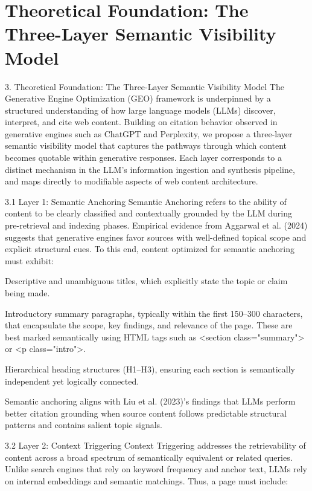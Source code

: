 \section{Theoretical Foundation: The Three-Layer Semantic Visibility Model}

3. Theoretical Foundation: The Three-Layer Semantic Visibility Model
The Generative Engine Optimization (GEO) framework is underpinned by a structured understanding of how large language models (LLMs) discover, interpret, and cite web content. Building on citation behavior observed in generative engines such as ChatGPT and Perplexity, we propose a three-layer semantic visibility model that captures the pathways through which content becomes quotable within generative responses. Each layer corresponds to a distinct mechanism in the LLM's information ingestion and synthesis pipeline, and maps directly to modifiable aspects of web content architecture.

3.1 Layer 1: Semantic Anchoring
Semantic Anchoring refers to the ability of content to be clearly classified and contextually grounded by the LLM during pre-retrieval and indexing phases. Empirical evidence from Aggarwal et al. (2024) suggests that generative engines favor sources with well-defined topical scope and explicit structural cues. To this end, content optimized for semantic anchoring must exhibit:

Descriptive and unambiguous titles, which explicitly state the topic or claim being made.

Introductory summary paragraphs, typically within the first 150–300 characters, that encapsulate the scope, key findings, and relevance of the page. These are best marked semantically using HTML tags such as <section class="summary"> or <p class="intro">.

Hierarchical heading structures (H1–H3), ensuring each section is semantically independent yet logically connected.

Semantic anchoring aligns with Liu et al. (2023)’s findings that LLMs perform better citation grounding when source content follows predictable structural patterns and contains salient topic signals.

3.2 Layer 2: Context Triggering
Context Triggering addresses the retrievability of content across a broad spectrum of semantically equivalent or related queries. Unlike search engines that rely on keyword frequency and anchor text, LLMs rely on internal embeddings and semantic matchings. Thus, a page must include:

